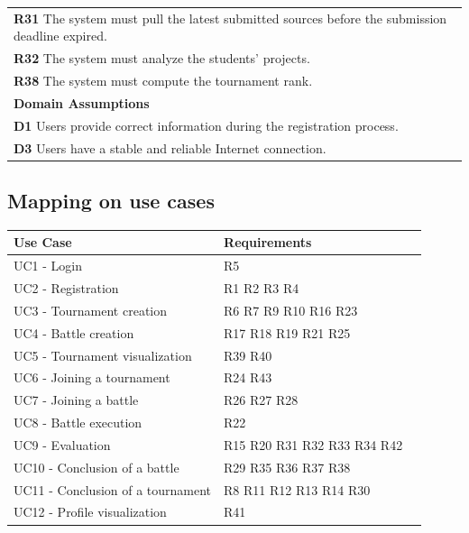 \begin{table}[H]
\begin{tabularx}{\textwidth}{X}
        \textbf{R31} The system must pull the latest submitted sources before the submission deadline expired.     \\ 
        \textbf{R32} The system must analyze the students' projects.      \\ 
        \textbf{R38} The system must compute the tournament rank.                 \\ 
        \midrule
        \textbf{Domain Assumptions}                                                                                                  \\ \midrule
        \textbf{D1} Users provide correct information during the registration process. \\          
        \textbf{D3} Users have a stable and reliable Internet connection. \\
        \bottomrule
    \end{tabularx}
\end{table}

\clearpage
\subsection{Mapping on use cases}
\begin{table}[H]
    \begin{tabularx}{\textwidth}{XXX}
        \toprule
        \textbf{Use Case}                     & \textbf{Requirements} \\ \midrule
        UC1 - Login                           & R5                   \\
        UC2 - Registration                    & R1 R2 R3 R4               \\
        UC3 - Tournament creation             & R6 R7 R9 R10 R16 R23  \\
        UC4 - Battle creation                 & R17 R18 R19 R21 R25       \\
        UC5 - Tournament visualization        & R39 R40          \\
        UC6 - Joining a tournament            & R24 R43        \\
        UC7 - Joining a battle                & R26 R27 R28      \\
        UC8 - Battle execution                & R22              \\
        UC9 - Evaluation                      & R15 R20 R31 R32 R33 R34 R42     \\
        UC10 - Conclusion of a battle         & R29 R35 R36 R37 R38         \\
        UC11 - Conclusion of a tournament     & R8 R11 R12 R13 R14 R30              \\
        UC12 - Profile visualization          & R41              \\
        \bottomrule
    \end{tabularx}
\end{table}

